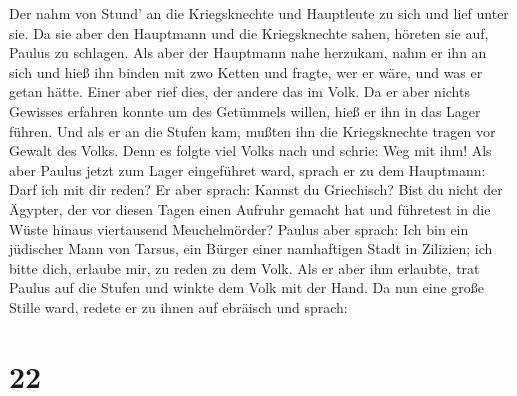  Der nahm von Stund' an die Kriegsknechte und Hauptleute zu
sich und lief unter sie. Da sie aber den Hauptmann und die Kriegsknechte
sahen, höreten sie auf, Paulus zu schlagen.  Als aber der
Hauptmann nahe herzukam, nahm er ihn an sich und hieß ihn binden mit zwo
Ketten und fragte, wer er wäre, und was er getan hätte. 
Einer aber rief dies, der andere das im Volk. Da er aber nichts Gewisses
erfahren konnte um des Getümmels willen, hieß er ihn in das Lager
führen.  Und als er an die Stufen kam, mußten ihn die
Kriegsknechte tragen vor Gewalt des Volks.  Denn es folgte
viel Volks nach und schrie: Weg mit ihm!  Als aber Paulus
jetzt zum Lager eingeführet ward, sprach er zu dem Hauptmann: Darf ich
mit dir reden? Er aber sprach: Kannst du Griechisch?  Bist
du nicht der Ägypter, der vor diesen Tagen einen Aufruhr gemacht hat und
führetest in die Wüste hinaus viertausend Meuchelmörder? 
Paulus aber sprach: Ich bin ein jüdischer Mann von Tarsus, ein Bürger
einer namhaftigen Stadt in Zilizien; ich bitte dich, erlaube mir, zu
reden zu dem Volk.  Als er aber ihm erlaubte, trat Paulus
auf die Stufen und winkte dem Volk mit der Hand. Da nun eine große
Stille ward, redete er zu ihnen auf ebräisch und sprach:

\hypertarget{section-21}{%
\section{22}\label{section-21}}

